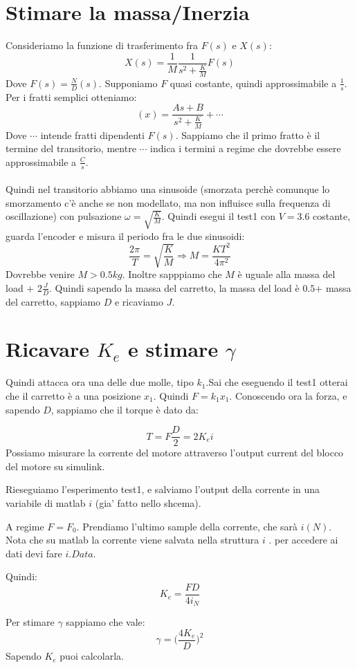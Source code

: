 \documentclass[10pt,a4paper]{article}
\begin{document}
\section{Stimare la massa/Inerzia}
Consideriamo la funzione di trasferimento fra $F(s)$ e $X(s)$:
$$X(s)= \frac{1}{M}\frac{1}{s^2+\frac{K}{M}}F(s)$$
Dove $F(s) = \frac{N}{D}(s)$. Supponiamo $F$ quasi costante, quindi approssimabile a $\frac{1}{s}$. Per i fratti semplici otteniamo:
$$(x) = \frac{As+B}{s^2+\frac{K}{M}}+\cdots$$
Dove $\cdots$ intende fratti dipendenti $F(s)$. Sappiamo che il primo fratto è il termine del transitorio, mentre $\cdots$  indica i termini a regime che dovrebbe essere approssimabile a $\frac{C}{s}$. \\ \\
Quindi nel transitorio abbiamo una sinusoide (smorzata perchè comunque lo smorzamento c'è anche se non modellato, ma non influisce sulla frequenza di oscillazione) con pulsazione $\omega = \sqrt{\frac{K}{M}}$. Quindi esegui il test1 con $V=3.6$ costante, guarda l'encoder e misura il periodo fra le due sinusoidi:
$$\frac{2\pi}{T}= \sqrt{\frac{K}{M}} \Rightarrow M = \frac{KT^2}{4\pi^2}$$
Dovrebbe venire $M > 0.5kg$.
Inoltre sapppiamo che $M$ è uguale alla massa del load + $2\frac{J}{D}$. Quindi sapendo la massa del carretto, la massa del load è $0.5$+ massa del carretto, sappiamo $D$ e ricaviamo $J$.
\newpage
\section{Ricavare $K_e$ e stimare $\gamma$}
Quindi attacca ora una delle due molle, tipo $k_1$.Sai che eseguendo il test1 otterai che il carretto è a una posizione $x_1$. Quindi $F=k_1 x_1$.
Conoscendo ora la forza, e sapendo $D$, sappiamo che il torque è dato da:

$$T = F\frac{D}{2} = 2K_e i$$
Possiamo misurare la corrente del motore attraverso l'output current del blocco del motore su simulink.

Rieseguiamo l'esperimento test1, e salviamo l'output della corrente in una variabile di matlab $i$ (gia' fatto nello shcema).

A regime $F=F_0$. Prendiamo l'ultimo sample della corrente, che sarà $i(N)$. Nota che su matlab la corrente viene salvata nella struttura $i$ . per accedere ai dati devi fare $i.Data$.

 Quindi:
$$K_e = \frac{FD}{4i_N}$$

Per stimare $\gamma$ sappiamo che vale:
$$\gamma = \Big(\frac{4K_e}{D}\Big)^2$$
Sapendo $K_e$ puoi calcolarla.
\end{document}
